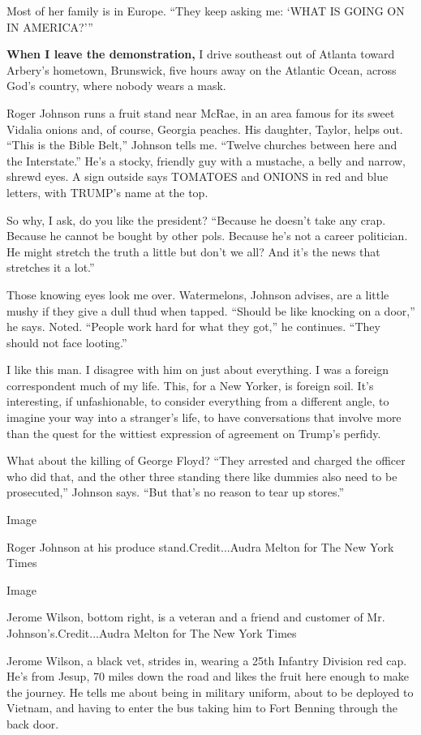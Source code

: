 Most of her family is in Europe. ``They keep asking me: `WHAT IS GOING
ON IN AMERICA?'''

\textbf{When I leave the demonstration,} I drive southeast out of
Atlanta toward Arbery's hometown, Brunswick, five hours away on the
Atlantic Ocean, across God's country, where nobody wears a mask.

Roger Johnson runs a fruit stand near McRae, in an area famous for its
sweet Vidalia onions and, of course, Georgia peaches. His daughter,
Taylor, helps out. ``This is the Bible Belt,'' Johnson tells me.
``Twelve churches between here and the Interstate.'' He's a stocky,
friendly guy with a mustache, a belly and narrow, shrewd eyes. A sign
outside says TOMATOES and ONIONS in red and blue letters, with TRUMP's
name at the top.

So why, I ask, do you like the president? ``Because he doesn't take any
crap. Because he cannot be bought by other pols. Because he's not a
career politician. He might stretch the truth a little but don't we all?
And it's the news that stretches it a lot.''

Those knowing eyes look me over. Watermelons, Johnson advises, are a
little mushy if they give a dull thud when tapped. ``Should be like
knocking on a door,'' he says. Noted. ``People work hard for what they
got,'' he continues. ``They should not face looting.''

I like this man. I disagree with him on just about everything. I was a
foreign correspondent much of my life. This, for a New Yorker, is
foreign soil. It's interesting, if unfashionable, to consider everything
from a different angle, to imagine your way into a stranger's life, to
have conversations that involve more than the quest for the wittiest
expression of agreement on Trump's perfidy.

What about the killing of George Floyd? ``They arrested and charged the
officer who did that, and the other three standing there like dummies
also need to be prosecuted,'' Johnson says. ``But that's no reason to
tear up stores.''

Image

Roger Johnson at his produce stand.Credit...Audra Melton for The New
York Times

Image

Jerome Wilson, bottom right, is a veteran and a friend and customer of
Mr. Johnson's.Credit...Audra Melton for The New York Times

Jerome Wilson, a black vet, strides in, wearing a 25th Infantry Division
red cap. He's from Jesup, 70 miles down the road and likes the fruit
here enough to make the journey. He tells me about being in military
uniform, about to be deployed to Vietnam, and having to enter the bus
taking him to Fort Benning through the back door.

